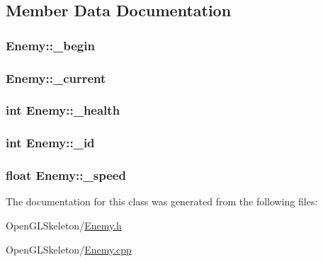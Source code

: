 \subsection{Member Data Documentation}
\subsubsection[{\texorpdfstring{\+\_\+begin}{_begin}}]{ Enemy\+::\+\_\+begin}\hypertarget{class_enemy_a01a372cdebe6f7c5aa819aff02e3d817}{}\label{class_enemy_a01a372cdebe6f7c5aa819aff02e3d817}
\subsubsection[{\texorpdfstring{\+\_\+current}{_current}}]{ Enemy\+::\+\_\+current}\hypertarget{class_enemy_a2e53518ca8125c08fd204e3bf810fc8d}{}\label{class_enemy_a2e53518ca8125c08fd204e3bf810fc8d}
\subsubsection[{\texorpdfstring{\+\_\+health}{_health}}]{\setlength{\rightskip}{0pt plus 5cm}int Enemy\+::\+\_\+health}\hypertarget{class_enemy_a410845277e89ce6c73b2df15d0621cf7}{}\label{class_enemy_a410845277e89ce6c73b2df15d0621cf7}
\subsubsection[{\texorpdfstring{\+\_\+id}{_id}}]{\setlength{\rightskip}{0pt plus 5cm}int Enemy\+::\+\_\+id}\hypertarget{class_enemy_abb5f5667c06218536bf516b249d2d4cb}{}\label{class_enemy_abb5f5667c06218536bf516b249d2d4cb}
\subsubsection[{\texorpdfstring{\+\_\+speed}{_speed}}]{\setlength{\rightskip}{0pt plus 5cm}float Enemy\+::\+\_\+speed}\hypertarget{class_enemy_a5ad8a827b28dd24331a434d1993d5c01}{}\label{class_enemy_a5ad8a827b28dd24331a434d1993d5c01}


The documentation for this class was generated from the following files\+:\begin{DoxyCompactItemize}
\item 
Open\+G\+L\+Skeleton/\hyperlink{_enemy_8h}{Enemy.\+h}\item 
Open\+G\+L\+Skeleton/\hyperlink{_enemy_8cpp}{Enemy.\+cpp}\end{DoxyCompactItemize}
